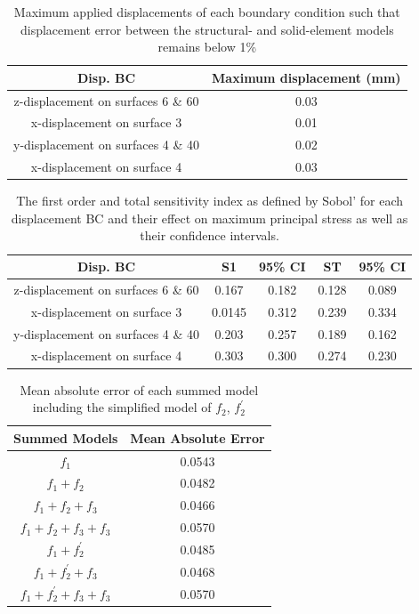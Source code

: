 
\begin{table}[h!]
\centering
\label{tab:max_disps}
\caption{\label{tab:max_disps}Maximum applied displacements of each boundary
condition such that displacement error between the structural- and solid-element
models remains below 1\%}

\begin{tabular}{ |c|c| } 
\hline
Disp. BC & Maximum displacement (mm) \\
\hline
z-displacement on surfaces 6 \& 60 & 0.03 \\ 
x-displacement on surface 3 & 0.01 \\ 
y-displacement on surfaces 4 \& 40 & 0.02\\ 
x-displacement on surface 4 & 0.03 \\ 
\hline
\end{tabular}
\end{table}

\begin{table}[h!]
\centering
\label{tab:sobol_indices}
\caption{\label{tab:sobol_indices}The first order and total sensitivity index as
defined by Sobol' for each displacement BC and their effect on maximum principal
stress as well as their confidence intervals.}
\begin{tabular}{ |c|c|c|c|c| } 
\hline
Disp. BC & S1 & 95\% CI & ST & 95\% CI \\
\hline
z-displacement on surfaces 6 \& 60 & 0.167 & 0.182 & 0.128 & 0.089 \\ 
x-displacement on surface 3 & 0.0145 & 0.312 & 0.239 & 0.334 \\ 
y-displacement on surfaces 4 \& 40 & 0.203 & 0.257 & 0.189 & 0.162 \\ 
x-displacement on surface 4 & 0.303 & 0.300 & 0.274 & 0.230 \\ 
\hline
\end{tabular}
\end{table}

\begin{table}[h!]
\centering
\label{tab:fitnesses}

\caption{\label{tab:fitnesses}Mean absolute error of each summed model including
the simplified model of $f_2$, $f^{'}_{2}$}

\begin{tabular}{ |c|c| } 
\hline
Summed Models & Mean Absolute Error \\
\hline
$f_1$ & 0.0543 \\ 
$f_1 + f_2$ & 0.0482 \\ 
$f_1 + f_2 + f_3$ & 0.0466 \\
$f_1 + f_2 + f_3 + f_3$ & 0.0570 \\
$f_1 + f^{'}_{2}$ & 0.0485 \\ 
$f_1 + f^{'}_{2} + f_3$ & 0.0468 \\
$f_1 + f^{'}_{2} + f_3 + f_3$ & 0.0570 \\
\hline
\end{tabular}
\end{table}